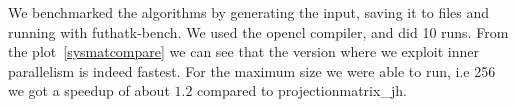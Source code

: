 We benchmarked the algorithms by generating the input, saving it to files and running with futhatk-bench. We used the opencl compiler, and did 10 runs. From the plot~\ref{sysmatcompare} we can see that the version where we exploit inner parallelism is indeed fastest. For the maximum size we were able to run, i.e 256 we got a speedup of about $1.2$ compared to projectionmatrix\_jh.
